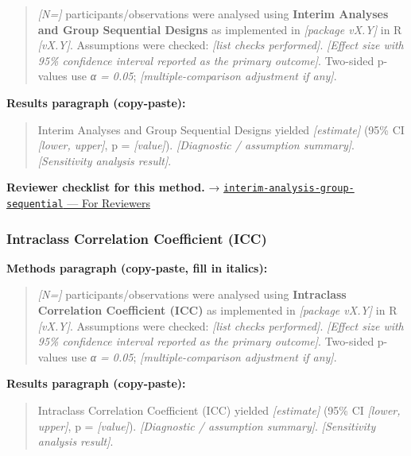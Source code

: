 \documentclass[
]{article}
\begin{document}
\begin{quote}
\emph{{[}N={]}} participants/observations were analysed using
\textbf{Interim Analyses and Group Sequential Designs} as implemented in
\emph{{[}package vX.Y{]}} in R \emph{{[}vX.Y{]}}. Assumptions were
checked: \emph{{[}list checks performed{]}}. \emph{{[}Effect size with
95\% confidence interval reported as the primary outcome{]}}. Two-sided
p-values use \emph{α = 0.05}; \emph{{[}multiple-comparison adjustment if
any{]}}.
\end{quote}

\textbf{Results paragraph (copy-paste):}

\begin{quote}
Interim Analyses and Group Sequential Designs yielded
\emph{{[}estimate{]}} (95\% CI \emph{{[}lower, upper{]}}, p =
\emph{{[}value{]}}). \emph{{[}Diagnostic / assumption summary{]}}.
\emph{{[}Sensitivity analysis result{]}}.
\end{quote}

\textbf{Reviewer checklist for this method.} →
\href{../chapters/14-clinical/interim-analysis-group-sequential.Rmd\#for-reviewers}{\texttt{interim-analysis-group-sequential}
--- For Reviewers}

\subsubsection{Intraclass Correlation Coefficient
(ICC)}\label{intraclass-correlation-coefficient-icc}

\textbf{Methods paragraph (copy-paste, fill in italics):}

\begin{quote}
\emph{{[}N={]}} participants/observations were analysed using
\textbf{Intraclass Correlation Coefficient (ICC)} as implemented in
\emph{{[}package vX.Y{]}} in R \emph{{[}vX.Y{]}}. Assumptions were
checked: \emph{{[}list checks performed{]}}. \emph{{[}Effect size with
95\% confidence interval reported as the primary outcome{]}}. Two-sided
p-values use \emph{α = 0.05}; \emph{{[}multiple-comparison adjustment if
any{]}}.
\end{quote}

\textbf{Results paragraph (copy-paste):}

\begin{quote}
Intraclass Correlation Coefficient (ICC) yielded \emph{{[}estimate{]}}
(95\% CI \emph{{[}lower, upper{]}}, p = \emph{{[}value{]}}).
\emph{{[}Diagnostic / assumption summary{]}}. \emph{{[}Sensitivity
analysis result{]}}.
\end{quote}
\end{document}
